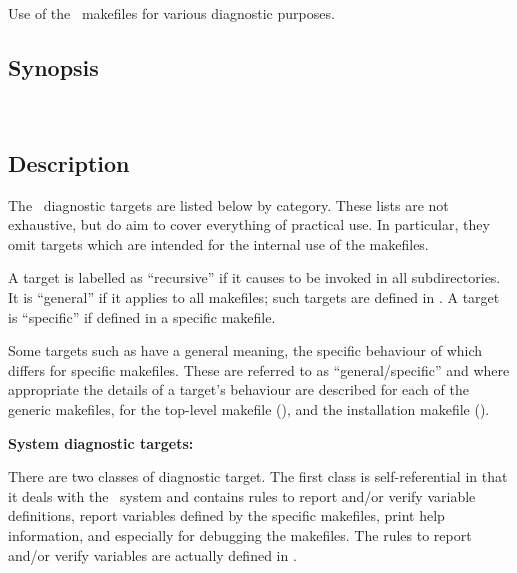 
Use of the \aipspp\ makefiles for various diagnostic purposes.

\subsection*{Synopsis}

\begin{synopsis}
   \\
\end{synopsis}

\subsection*{Description}

The \aipspp\ diagnostic targets are listed below by category.  These lists
are not exhaustive, but do aim to cover everything of practical use.  In
particular, they omit targets which are intended for the internal use of the
makefiles.

A target is labelled as ``recursive'' if it causes  to be
invoked in all subdirectories.  It is ``general'' if it applies to all
makefiles; such targets are defined in .  A target is
``specific'' if defined in a specific makefile.

Some targets such as  have a general meaning, the specific
behaviour of which differs for specific makefiles.  These are referred to as
``general/specific'' and where appropriate the details of a target's behaviour
are described for each of the generic makefiles, for the top-level makefile
(), and the installation makefile ().

\noindent
\textbf{System diagnostic targets:}

\noindent
There are two classes of diagnostic target.  The first class is
self-referential in that it deals with the \aipspp\ system and contains rules
to report and/or verify  variable definitions, report
variables defined by the specific makefiles, print help information, and
especially for debugging the makefiles.  The rules to report and/or verify
 variables are actually defined in .


